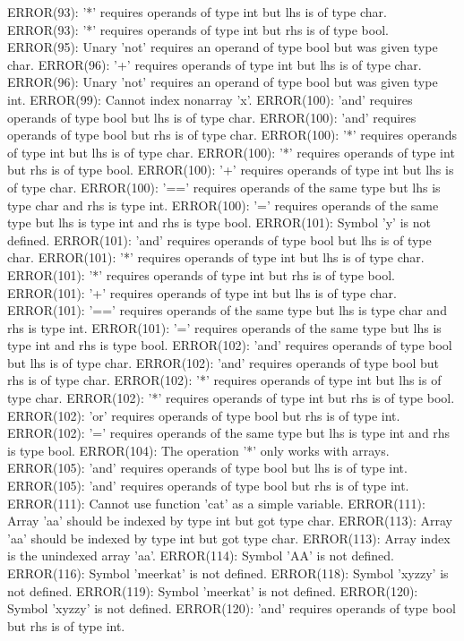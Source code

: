 \documentclass[12pt]{book}
\begin{document}
ERROR(93): '*' requires operands of type int but lhs is of type char.
ERROR(93): '*' requires operands of type int but rhs is of type bool.
ERROR(95): Unary 'not' requires an operand of type bool but was given type char.
ERROR(96): '+' requires operands of type int but lhs is of type char.
ERROR(96): Unary 'not' requires an operand of type bool but was given type int.
ERROR(99): Cannot index nonarray 'x'.
ERROR(100): 'and' requires operands of type bool but lhs is of type char.
ERROR(100): 'and' requires operands of type bool but rhs is of type char.
ERROR(100): '*' requires operands of type int but lhs is of type char.
ERROR(100): '*' requires operands of type int but rhs is of type bool.
ERROR(100): '+' requires operands of type int but lhs is of type char.
ERROR(100): '==' requires operands of the same type but lhs is type char and rhs is type int.
ERROR(100): '=' requires operands of the same type but lhs is type int and rhs is type bool.
ERROR(101): Symbol 'y' is not defined.
ERROR(101): 'and' requires operands of type bool but lhs is of type char.
ERROR(101): '*' requires operands of type int but lhs is of type char.
ERROR(101): '*' requires operands of type int but rhs is of type bool.
ERROR(101): '+' requires operands of type int but lhs is of type char.
ERROR(101): '==' requires operands of the same type but lhs is type char and rhs is type int.
ERROR(101): '=' requires operands of the same type but lhs is type int and rhs is type bool.
ERROR(102): 'and' requires operands of type bool but lhs is of type char.
ERROR(102): 'and' requires operands of type bool but rhs is of type char.
ERROR(102): '*' requires operands of type int but lhs is of type char.
ERROR(102): '*' requires operands of type int but rhs is of type bool.
ERROR(102): 'or' requires operands of type bool but rhs is of type int.
ERROR(102): '=' requires operands of the same type but lhs is type int and rhs is type bool.
ERROR(104): The operation '*' only works with arrays.
ERROR(105): 'and' requires operands of type bool but lhs is of type int.
ERROR(105): 'and' requires operands of type bool but rhs is of type int.
ERROR(111): Cannot use function 'cat' as a simple variable.
ERROR(111): Array 'aa' should be indexed by type int but got type char.
ERROR(113): Array 'aa' should be indexed by type int but got type char.
ERROR(113): Array index is the unindexed array 'aa'.
ERROR(114): Symbol 'AA' is not defined.
ERROR(116): Symbol 'meerkat' is not defined.
ERROR(118): Symbol 'xyzzy' is not defined.
ERROR(119): Symbol 'meerkat' is not defined.
ERROR(120): Symbol 'xyzzy' is not defined.
ERROR(120): 'and' requires operands of type bool but rhs is of type int.
\end{document}
